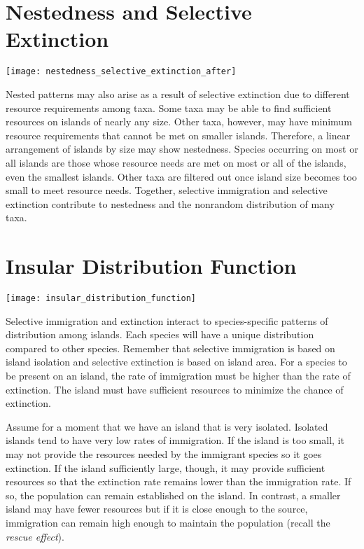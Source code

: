 \documentclass{tufte-handout}
\begin{document}
\section{Nestedness and Selective Extinction}
\begin{marginfigure}%
	\texttt{[image: nestedness\_selective\_extinction\_after]}
\end{marginfigure} 

Nested patterns may also arise as a result of selective extinction due to different resource requirements among taxa.  Some taxa may be able to find sufficient resources on islands of nearly any size.  Other taxa, however, may have minimum resource requirements that cannot be met on smaller islands.  Therefore, a linear arrangement of islands by size may show nestedness.  Species occurring on most or all islands are those whose resource needs are met on most or all of the islands, even the smallest islands.  Other taxa are filtered out once island size becomes too small to meet resource needs.  Together, selective immigration and selective extinction contribute to nestedness and the nonrandom distribution of many taxa. 

\section{Insular Distribution Function}
\begin{marginfigure}%
	\texttt{[image: insular\_distribution\_function]}
\end{marginfigure} 

Selective immigration and extinction interact to species-specific patterns of distribution among islands. Each species will have a unique distribution compared to other species.  Remember that selective immigration is based on island isolation and selective extinction is based on island area.  For a species to be present on an island, the rate of immigration must be higher than the rate of extinction.  The island must have sufficient resources to minimize the chance of extinction.

 Assume for a moment that we have an island that is very isolated.  Isolated islands tend to have very low rates of immigration.  If the island is too small, it may not provide the resources needed by the immigrant species so it goes extinction.  If the island sufficiently large, though, it may provide sufficient resources so that the extinction rate remains lower than the immigration rate. If so, the population can remain established on the island. In contrast, a smaller island may have fewer resources but if it is close enough to the source, immigration can remain high enough to maintain the population (recall the \textit{rescue effect}). 
 
\end{document}
